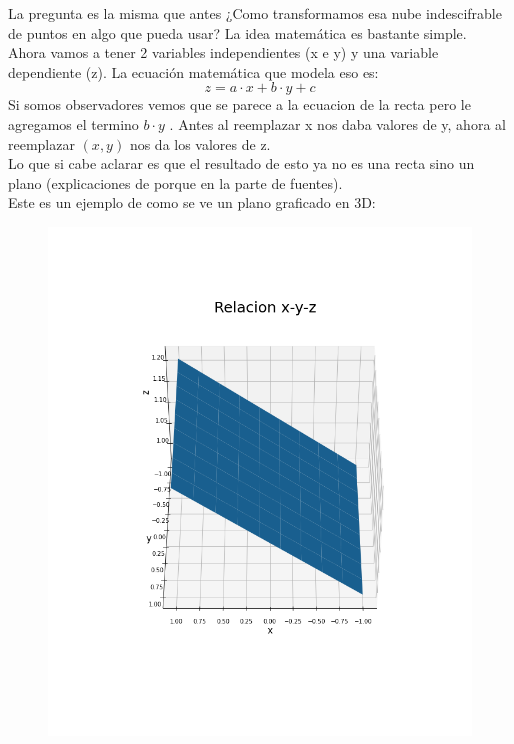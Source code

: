\documentclass{article}
\begin{document}
\newpage
La pregunta es la misma que antes ¿Como transformamos esa nube indescifrable de puntos en algo que pueda usar? La idea matemática es bastante simple.\\
Ahora vamos a tener 2 variables independientes (x e y) y una variable dependiente (z). La ecuación matemática que modela eso es:
\begin{equation*}
    z=a\cdot x+b\cdot y+c
\end{equation*}
Si somos observadores vemos que se parece a la ecuacion de la recta pero le agregamos el termino $b\cdot y$ . Antes al reemplazar x nos daba valores de y, ahora al reemplazar $(x,y)$ nos da los valores de z.\\
Lo que si cabe aclarar es que el resultado de esto ya no es una recta sino un plano (explicaciones de porque en la parte de fuentes).\\
Este es un ejemplo de como se ve un plano graficado en 3D:\\
\begin{figure}[h!]
\includegraphics[scale=0.5]{Imagenes/plano.png}
\centering
\end{figure}
\end{document}
